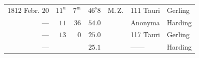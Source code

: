 \begin{center}\fontsize{10}{12}\selectfont\setlength{\tabcolsep}{3pt}\renewcommand{\arraystretch}{1.15}\begin{tabular}{rrrrlll}
1812 Febr. 20 & $11^{\mathrm u}$ & $7^{\mathrm m}$ & $46^{\mathrm s}8$ & M.\,Z. & 111 Tauri & Gerling\\
— & $11$ & $36$ & $54.0$ &  & Anonyma & Harding\\
— & $13$ & $0$ & $25.0$ &  & 117 Tauri & Gerling\\
— &  &  & $25.1$ &  & —\quad — & Harding\\
\end{tabular}\end{center}
